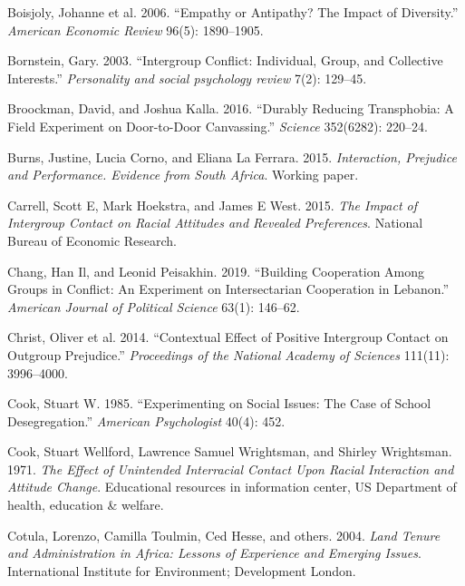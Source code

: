 \documentclass[11pt]{article}
\begin{document}
\begin{cslreferences}
\leavevmode\hypertarget{ref-boisjoly2006empathy}{}%
Boisjoly, Johanne et al. 2006. ``Empathy or Antipathy? The Impact of
Diversity.'' \emph{American Economic Review} 96(5): 1890--1905.

\leavevmode\hypertarget{ref-bornstein2003intergroup}{}%
Bornstein, Gary. 2003. ``Intergroup Conflict: Individual, Group, and
Collective Interests.'' \emph{Personality and social psychology review}
7(2): 129--45.

\leavevmode\hypertarget{ref-broockman2016durably}{}%
Broockman, David, and Joshua Kalla. 2016. ``Durably Reducing
Transphobia: A Field Experiment on Door-to-Door Canvassing.''
\emph{Science} 352(6282): 220--24.

\leavevmode\hypertarget{ref-burns2015interaction}{}%
Burns, Justine, Lucia Corno, and Eliana La Ferrara. 2015.
\emph{Interaction, Prejudice and Performance. Evidence from South
Africa}. Working paper.

\leavevmode\hypertarget{ref-carrell2015impact}{}%
Carrell, Scott E, Mark Hoekstra, and James E West. 2015. \emph{The
Impact of Intergroup Contact on Racial Attitudes and Revealed
Preferences}. National Bureau of Economic Research.

\leavevmode\hypertarget{ref-chang2019building}{}%
Chang, Han Il, and Leonid Peisakhin. 2019. ``Building Cooperation Among
Groups in Conflict: An Experiment on Intersectarian Cooperation in
Lebanon.'' \emph{American Journal of Political Science} 63(1): 146--62.

\leavevmode\hypertarget{ref-christ2014contextual}{}%
Christ, Oliver et al. 2014. ``Contextual Effect of Positive Intergroup
Contact on Outgroup Prejudice.'' \emph{Proceedings of the National
Academy of Sciences} 111(11): 3996--4000.

\leavevmode\hypertarget{ref-cook1985experimenting}{}%
Cook, Stuart W. 1985. ``Experimenting on Social Issues: The Case of
School Desegregation.'' \emph{American Psychologist} 40(4): 452.

\leavevmode\hypertarget{ref-cook1971race}{}%
Cook, Stuart Wellford, Lawrence Samuel Wrightsman, and Shirley
Wrightsman. 1971. \emph{The Effect of Unintended Interracial Contact
Upon Racial Interaction and Attitude Change}. Educational resources in
information center, US Department of health, education \& welfare.

\leavevmode\hypertarget{ref-cotula2004land}{}%
Cotula, Lorenzo, Camilla Toulmin, Ced Hesse, and others. 2004.
\emph{Land Tenure and Administration in Africa: Lessons of Experience
and Emerging Issues}. International Institute for Environment;
Development London.


\end{cslreferences}
\end{document}
